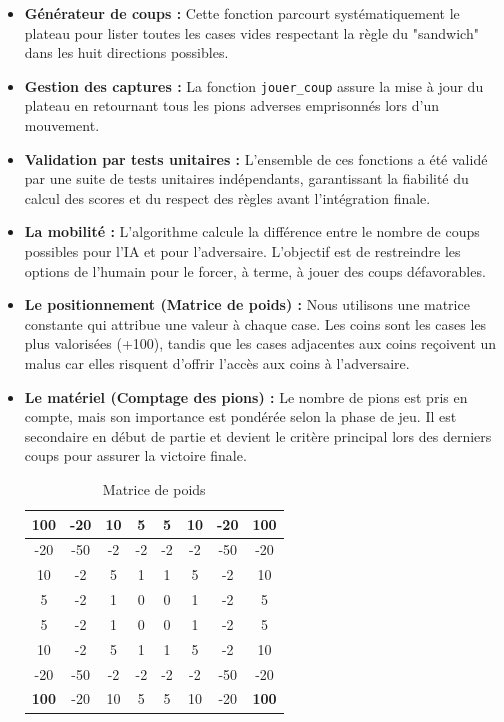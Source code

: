 \documentclass{article}
\begin{document}
\begin{itemize}
    \item \textbf{Générateur de coups :} Cette fonction parcourt systématiquement le plateau pour lister toutes les cases vides respectant la règle du "sandwich" dans les huit directions possibles.
    \item \textbf{Gestion des captures :} La fonction \texttt{jouer\_coup} assure la mise à jour du plateau en retournant tous les pions adverses emprisonnés lors d'un mouvement.
    \item \textbf{Validation par tests unitaires :} L'ensemble de ces fonctions a été validé par une suite de tests unitaires indépendants, garantissant la fiabilité du calcul des scores et du respect des règles avant l'intégration finale.
    \item \textbf{La mobilité :} L'algorithme calcule la différence entre le nombre de coups possibles pour l'IA et pour l'adversaire. L'objectif est de restreindre les options de l'humain pour le forcer, à terme, à jouer des coups défavorables.

    \item \textbf{Le positionnement (Matrice de poids) :} Nous utilisons une matrice constante qui attribue une valeur à chaque case. Les coins sont les cases les plus valorisées (+100), tandis que les cases adjacentes aux coins reçoivent un malus car elles risquent d'offrir l'accès aux coins à l'adversaire.

    \item \textbf{Le matériel (Comptage des pions) :} Le nombre de pions est pris en compte, mais son importance est pondérée selon la phase de jeu. Il est secondaire en début de partie et devient le critère principal lors des derniers coups pour assurer la victoire finale.

\begin{table}[H]
\centering
\caption{Matrice de poids}
\begin{tabular}{|c|c|c|c|c|c|c|c|}
\hline
\rowcolor{pink!20} \textbf{100} & -20 & 10 & 5 & 5 & 10 & -20 & \textbf{100} \\ \hline
-20 & -50 & -2 & -2 & -2 & -2 & -50 & -20 \\ \hline
10 & -2 & 5 & 1 & 1 & 5 & -2 & 10 \\ \hline
5 & -2 & 1 & 0 & 0 & 1 & -2 & 5 \\ \hline
5 & -2 & 1 & 0 & 0 & 1 & -2 & 5 \\ \hline
10 & -2 & 5 & 1 & 1 & 5 & -2 & 10 \\ \hline
-20 & -50 & -2 & -2 & -2 & -2 & -50 & -20 \\ \hline
\rowcolor{pink!20} \textbf{100} & -20 & 10 & 5 & 5 & 10 & -20 & \textbf{100} \\ \hline
\end{tabular}
\end{table}
\end{itemize}
\end{document}
